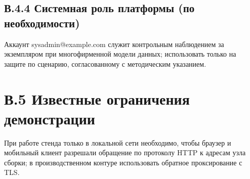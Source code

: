 \subsection*{В.4.4 Системная роль платформы (по необходимости)}

Аккаунт sysadmin@example.com служит контрольным наблюдением за экземпляром при многофирменной модели данных; использовать только на защите по сценарию, согласованному с методическим указанием.

\section*{В.5 Известные ограничения демонстрации}

При работе стенда только в локальной сети необходимо, чтобы браузер и мобильный клиент разрешали обращение по протоколу HTTP к адресам узла сборки; в производственном контуре использовать обратное проксирование с TLS.
